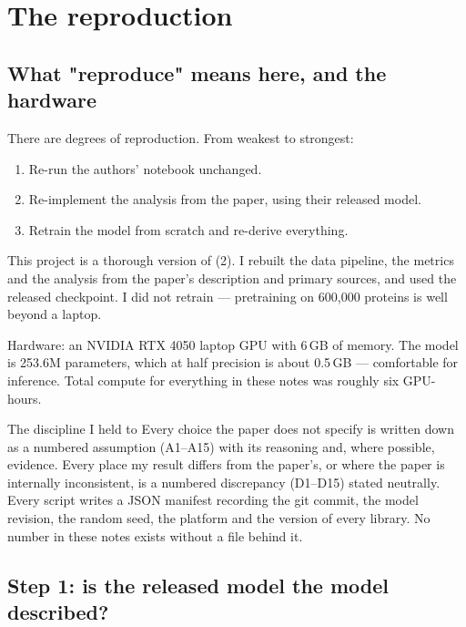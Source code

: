 \chapter{The reproduction}
\label{ch:reproduction}

\section{What "reproduce" means here, and the hardware}

There are degrees of reproduction. From weakest to strongest:

\begin{enumerate}[leftmargin=*,itemsep=2pt]
  \item Re-run the authors' notebook unchanged.
  \item Re-implement the analysis from the paper, using their released model.
  \item Retrain the model from scratch and re-derive everything.
\end{enumerate}

This project is a thorough version of (2). I rebuilt the data pipeline,
the metrics and the analysis from the paper's description and primary sources,
and used the released checkpoint. I did not retrain --- pretraining on 600{,}000
proteins is well beyond a laptop.

Hardware: an NVIDIA RTX 4050 laptop GPU with 6\,GB of memory. The model is
253.6M parameters, which at half precision is about 0.5\,GB --- comfortable for
inference. Total compute for everything in these notes was roughly six
GPU-hours.

\begin{keybox}{The discipline I held to}
Every choice the paper does not specify is written down as a numbered
assumption (A1--A15) with its reasoning and, where possible, evidence. Every
place my result differs from the paper's, or where the paper is internally
inconsistent, is a numbered discrepancy (D1--D15) stated neutrally. Every script
writes a JSON manifest recording the git commit, the model revision, the random
seed, the platform and the version of every library. No number in these notes
exists without a file behind it.
\end{keybox}

\section{Step 1: is the released model the model described?}
\label{sec:checkpoint}

